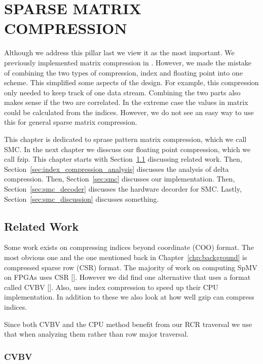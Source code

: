 \chapter{SPARSE MATRIX COMPRESSION}
\label{chp:compression}

Although we address this pillar last we view it as the most important. We previously implemented matrix compression in \cite{prelim:townsend}. However, we made the mistake of combining the two types of compression, index and floating point into one scheme. This simplified some aspects of the design. For example, this compression only needed to keep track of one data stream. Combining the two parts also makes sense if the two are correlated. In the extreme case the values in matrix could be calculated from the indices. However, we do not see an easy way to use this for general sparse matrix compression.

This chapter is dedicated to sprase pattern matrix compression, which we call SMC. In the next chapter we disscuss our floating point compression, which we call fzip. This chapter starts with Section~\ref{sec:index_compression_related_work} discussing related work. Then, Section~\ref{sec:index_compression_analysis} discusses the analysis of delta compression. Then, Section~\ref{sec:smc} discusses our implementation. Then, Section~\ref{sec:smc_decoder} discusses the hardware decorder for SMC. Lastly, Section~\ref{sec:smc_discussion} discusses something.

\section{Related Work}
\label{sec:index_compression_related_work}
Some work exists on compressing indices beyond coordinate (COO) format. The most obvious one and the one mentioned back in Chapter~\ref{chp:background} is compressed sparse row (CSR) format. The majority of work on computing SpMV on FPGAs uses CSR [\cite{prelim:nagar1}]. However we did find one alternative that uses a format called CVBV [\cite{prelim:kestur}]. Also, \cite{prelim:kourtis} uses index compression to speed up their CPU implementation. In addition to these we also look at how well gzip can compress indices.

Since both CVBV and the CPU method benefit from our RCR traversal we use that when analyzing them rather than row major traversal.
\subsection{CVBV}


